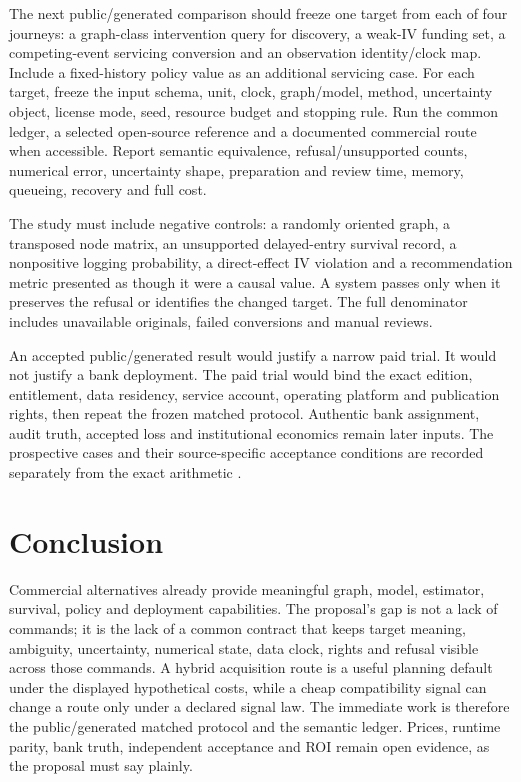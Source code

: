 The next public/generated comparison should freeze one target from each of four
journeys: a graph-class intervention query for discovery, a weak-IV funding set, a
competing-event servicing conversion and an observation identity/clock map.
Include a fixed-history policy value as an additional servicing case. For each target, freeze the
input schema, unit, clock, graph/model, method, uncertainty object, license
mode, seed, resource budget and stopping rule. Run the common ledger, a selected
open-source reference and a documented commercial route when accessible. Report
semantic equivalence, refusal/unsupported counts, numerical error, uncertainty
shape, preparation and review time, memory, queueing, recovery and full cost.

The study must include negative controls: a randomly oriented graph, a
transposed node matrix, an unsupported delayed-entry survival record, a
nonpositive logging probability, a direct-effect IV violation and a recommendation
metric presented as though it were a causal value. A system passes only when it
preserves the refusal or identifies the changed target. The full denominator
includes unavailable originals, failed conversions and manual reviews.

An accepted public/generated result would justify a narrow paid trial. It would
not justify a bank deployment. The paid trial would bind the exact edition,
entitlement, data residency, service account, operating platform and publication
rights, then repeat the frozen matched protocol. Authentic bank assignment,
audit truth, accepted loss and institutional economics remain later inputs.
The prospective cases and their source-specific acceptance conditions are
recorded separately from the exact arithmetic \citep{exec17_s8_design}.

\section{Conclusion}
\label{exec17:s8-end}

Commercial alternatives already provide meaningful graph, model, estimator,
survival, policy and deployment capabilities. The proposal's gap is not a lack
of commands; it is the lack of a common contract that keeps target meaning,
ambiguity, uncertainty, numerical state, data clock, rights and refusal visible
across those commands. A hybrid acquisition route is a useful planning default
under the displayed hypothetical costs, while a cheap compatibility signal can
change a route only under a declared signal law. The immediate work is therefore
the public/generated matched protocol and the semantic ledger. Prices, runtime
parity, bank truth, independent acceptance and ROI remain open evidence, as the
proposal must say plainly.
